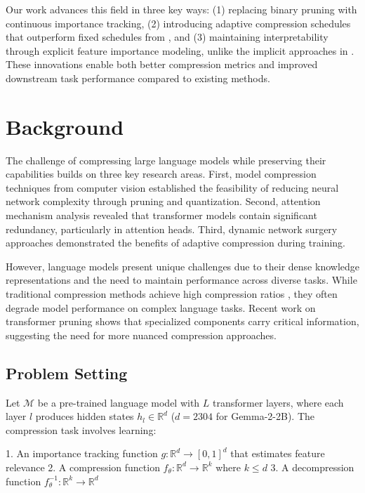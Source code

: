 \documentclass{article} %
\begin{document}
Our work advances this field in three key ways: (1) replacing binary pruning with continuous importance tracking, (2) introducing adaptive compression schedules that outperform fixed schedules from \cite{Li2020EfficientTL}, and (3) maintaining interpretability through explicit feature importance modeling, unlike the implicit approaches in \cite{Michel2019AreSH}. These innovations enable both better compression metrics and improved downstream task performance compared to existing methods.

\section{Background}
\label{sec:background}

The challenge of compressing large language models while preserving their capabilities builds on three key research areas. First, model compression techniques from computer vision \cite{Han2015DeepCC} established the feasibility of reducing neural network complexity through pruning and quantization. Second, attention mechanism analysis \cite{Michel2019AreSH} revealed that transformer models contain significant redundancy, particularly in attention heads. Third, dynamic network surgery approaches \cite{Guo2016DynamicNS} demonstrated the benefits of adaptive compression during training.

However, language models present unique challenges due to their dense knowledge representations and the need to maintain performance across diverse tasks. While traditional compression methods achieve high compression ratios \cite{Han2015LearningBW}, they often degrade model performance on complex language tasks. Recent work on transformer pruning \cite{Voita2019AnalyzingMS} shows that specialized components carry critical information, suggesting the need for more nuanced compression approaches.

\subsection{Problem Setting}

Let $\mathcal{M}$ be a pre-trained language model with $L$ transformer layers, where each layer $l$ produces hidden states $h_l \in \mathbb{R}^{d}$ ($d=2304$ for Gemma-2-2B). The compression task involves learning:

1. An importance tracking function $g: \mathbb{R}^d \rightarrow [0,1]^d$ that estimates feature relevance
2. A compression function $f_\theta: \mathbb{R}^d \rightarrow \mathbb{R}^k$ where $k \leq d$
3. A decompression function $f^{-1}_\theta: \mathbb{R}^k \rightarrow \mathbb{R}^d$
\end{document}
